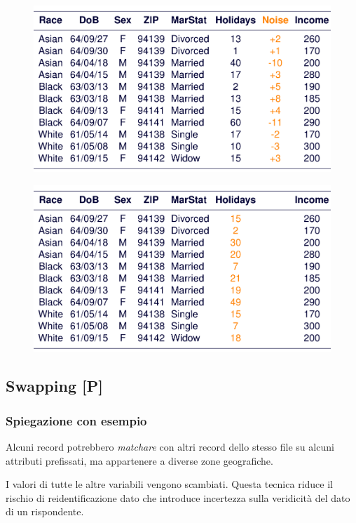\documentclass{report}
\begin{document}
\begin{figure}[ht]
    \centering
    \includegraphics[width=0.75\linewidth]{images/noise1.png}
\end{figure}
\begin{figure}[ht]
    \centering
    \includegraphics[width=0.75\linewidth]{images/noise2.png}
\end{figure}

\newpage
\subsection{Swapping [P]}
\subsubsection{Spiegazione con esempio}
Alcuni record potrebbero \textit{matchare} con altri record dello stesso 
file su alcuni attributi prefissati, ma appartenere a diverse zone geografiche.

I valori di tutte le altre variabili vengono scambiati. Questa tecnica 
riduce il rischio di reidentificazione dato che introduce incertezza
sulla veridicità del dato di un rispondente.
\end{document}
